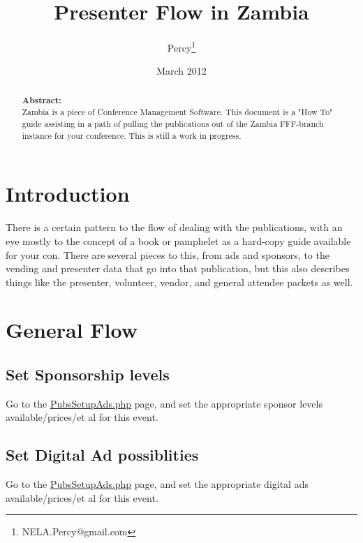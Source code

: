 \documentclass[captions=tablesignature]{scrartcl}
\author{Percy\thanks{NELA.Percy@gmail.com}}
\date{March 2012}
\title{Presenter Flow in Zambia}
\begin{document}
\maketitle
{}
\thispagestyle{fancy}
\renewcommand{\headrulewidth}{0pt}
\renewcommand{\footrulewidth}{0pt}
\lhead{}
\rhead{}
\chead{}
\lfoot{}
\cfoot{}
\rfoot{}
\begin{abstract}
\vspace{5cm}
{\LARGE{\textbf{Abstract:\\}}}
Zambia is a piece of Conference Management Software.  This document is a "How To" guide assisting in a path of pulling the publications out of the Zambia FFF-branch instance for your conference.  This is still a work in progress.
\end{abstract}
\newpage
\renewcommand{\headrulewidth}{1pt}
\renewcommand{\footrulewidth}{1pt}
\rfoot{\thepage}
\setcounter{tocdepth}{3}
\tableofcontents
\listoffigures
\listoftables
\newpage
{}
\section{Introduction}
\label{sec-1}

There is a certain pattern to the flow of dealing with the
publications, with an eye mostly to the concept of a book or
pamphelet as a hard-copy guide available for your con.  There are
several pieces to this, from ads and sponsors, to the vending and
presenter data that go into that publication, but this also
describes things like the presenter, volunteer, vendor, and general
attendee packets as well.
\section{General Flow}
\label{sec-2}
\subsection{Set Sponsorship levels}
\label{sec-2-1}
Go to the \href{../webpages/PubsSetupAds.php}{PubsSetupAds.php} page, and set the
appropriate sponsor levels available/prices/et al for this event.

\subsection{Set Digital Ad possiblities}
\label{sec-2-2}
Go to the \href{../webpages/PubsSetupAds.php}{PubsSetupAds.php} page, and set the
appropriate digital ads available/prices/et al for this event.
\end{document}
